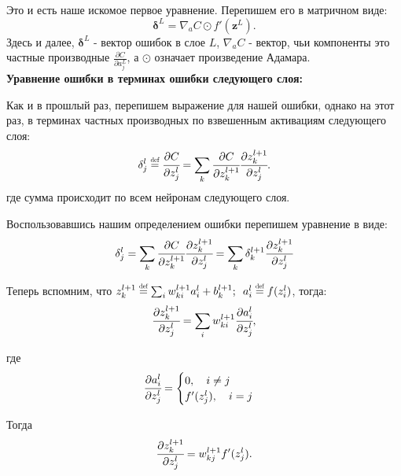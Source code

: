 Это и есть наше искомое первое уравнение. Перепишем его в матричном виде:
\begin{equation}
    \bm{\delta}^L = \nabla_a C \odot f'(\bm{z}^L).
    \tag{I}
\end{equation}
Здесь и далее, $\bm{\delta}^L$ - вектор ошибок в слое $L$, 
$\nabla_a C$ - вектор, чьи компоненты это частные производные 
$\frac{\partial C}{\partial a_j^L}$, а $\odot$ означает произведение Адамара.\\

\noindent\textbf{Уравнение ошибки в терминах ошибки следующего слоя:}

Как и в прошлый раз, перепишем выражение для нашей ошибки, однако на этот раз, 
в терминах частных производных по взвешенным активациям следующего слоя:
\begin{equation*}
    \delta_j^l \defeq \cfrac{\partial C}{\partial z_j^l} = 
    \sum_k \cfrac{\partial C}{\partial z_k^{l+1}} \cfrac{\partial z_k^{l+1}}{\partial z_j^l}.
\end{equation*}
где сумма происходит по всем нейронам следующего слоя. 

Воспользовавшись нашим определением ошибки перепишем уравнение в виде:
\begin{equation}
    \delta_j^l = 
    \sum_k \cfrac{\partial C}{\partial z_k^{l+1}} \cfrac{\partial z_k^{l+1}}{\partial z_j^l} = 
    \sum_k \delta_k^{l+1} \cfrac{\partial z_k^{l+1}}{\partial z_j^l}
\end{equation}

Теперь вспомним, что $z_k^{l+1} \defeq \sum_i w_{ki}^{l+1} a_i^l + b_k^{l+1};\hspace{5pt} a_i^l \defeq f(z_i^l)$, тогда:
\begin{equation*}
    \cfrac{\partial z_k^{l+1}}{\partial z_j^l} = \sum_i w_{ki}^{l+1} \cfrac{\partial a_i^l}{\partial z_j^l},
\end{equation*}

где 
\begin{equation*}
    \cfrac{\partial a_i^l}{\partial z_j^l} = \begin{cases}
        0, \quad i \neq j \\
        f'(z_j^l), \quad i = j
    \end{cases}
\end{equation*}

Тогда
\begin{equation*}
    \cfrac{\partial z_k^{l+1}}{\partial z_j^l} = w_{kj}^{l+1} f'(z_j^l).
\end{equation*}

